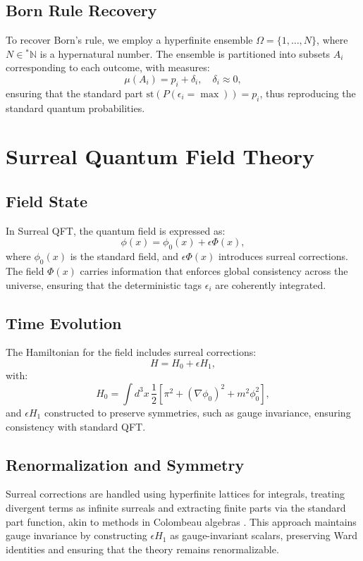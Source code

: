 \documentclass{article}
\begin{document}
\subsection{Born Rule Recovery}
To recover Born's rule, we employ a hyperfinite ensemble \(\Omega = \{1, \dots, N\}\), where \(N \in {}^*\mathbb{N}\) is a hypernatural number. The ensemble is partitioned into subsets \(A_i\) corresponding to each outcome, with measures:
\begin{equation}
\mu(A_i) = p_i + \delta_i, \quad \delta_i \approx 0,
\end{equation}
ensuring that the standard part \(\text{st}(P(\epsilon_i = \max)) = p_i\), thus reproducing the standard quantum probabilities.

\section{Surreal Quantum Field Theory}
\subsection{Field State}
In Surreal QFT, the quantum field is expressed as:
\begin{equation}
\phi(x) = \phi_0(x) + \epsilon \Phi(x),
\end{equation}
where \(\phi_0(x)\) is the standard field, and \(\epsilon \Phi(x)\) introduces surreal corrections. The field \(\Phi(x)\) carries information that enforces global consistency across the universe, ensuring that the deterministic tags \(\epsilon_i\) are coherently integrated.

\subsection{Time Evolution}
The Hamiltonian for the field includes surreal corrections:
\begin{equation}
H = H_0 + \epsilon H_1,
\end{equation}
with:
\begin{equation}
H_0 = \int d^3x \, \frac{1}{2} [\pi^2 + (\nabla \phi_0)^2 + m^2 \phi_0^2],
\end{equation}
and \(\epsilon H_1\) constructed to preserve symmetries, such as gauge invariance, ensuring consistency with standard QFT.

\subsection{Renormalization and Symmetry}
Surreal corrections are handled using hyperfinite lattices for integrals, treating divergent terms as infinite surreals and extracting finite parts via the standard part function, akin to methods in Colombeau algebras \cite{Grosser2001}. This approach maintains gauge invariance by constructing \(\epsilon H_1\) as gauge-invariant scalars, preserving Ward identities and ensuring that the theory remains renormalizable.
\end{document}
